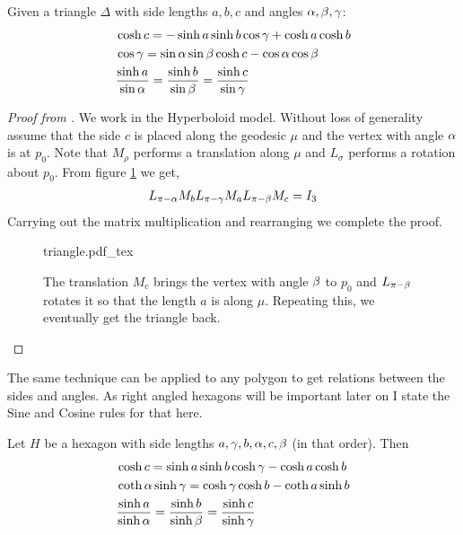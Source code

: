\begin{theorem}
  Given a triangle $\Delta$ with side lengths $a,b,c$ and angles $\alpha,\beta,\gamma$:
  \begin{align}
    &\cosh{c} = -\sinh{a}\sinh{b}\cos{\gamma} + \cosh{a}\cosh{b}\\
    &\cos{\gamma} = \sin{\alpha}\sin{\beta}\cosh{c} - \cos{\alpha}\cos{\beta}\\
    &\frac{\sinh{a}}{\sin{\alpha}} = \frac{\sinh{b}}{\sin{\beta}} = \frac{\sinh{c}}{\sin{\gamma}}
  \end{align}
\end{theorem}
\begin{proof}[Proof from \cite{buser}]
  We work in the Hyperboloid model. Without loss of generality assume that the side $c$ is placed along the geodesic $\mu$ and the vertex with angle $\alpha$ is at $p_0$. Note that $M_\rho$ performs a translation along $\mu$ and $L_\sigma$ performs a rotation about $p_0$. From figure \ref{fig:triangle0} we get,
  \begin{align}
    L_{\pi-\alpha}M_b L_{\pi-\gamma} M_a L_{\pi-\beta} M_c = I_3
  \end{align}
  Carrying out the matrix multiplication and rearranging we complete the proof.
  \begin{figure}[h]
    \centering
    \def\svgwidth{0.7\textwidth}
    {triangle.pdf_tex}
    \caption[Proof of sine and cosine laws.]{The translation $M_c$ brings the vertex with angle $\beta$ to $p_0$ and $L_{\pi-\beta}$ rotates it so that the length $a$ is along $\mu$. Repeating this, we eventually get the triangle back.}
    \label{fig:triangle0}
  \end{figure}
\end{proof}
The same technique can be applied to any polygon to get relations between the sides and angles. As right angled hexagons will be important later on I state the Sine and Cosine rules for that here.
\begin{theorem}\label{thm:hexagon}
  Let $H$ be a hexagon with side lengths $a,\gamma, b, \alpha, c, \beta$ (in that order). Then
  \begin{align}    
    &\cosh{c} = \sinh{a}\sinh{b}\cosh{\gamma} - \cosh{a}\cosh{b}\\
    &\coth{\alpha} \sinh{\gamma} = \cosh{\gamma}\cosh{b} - \coth{a}\sinh{b}\\
    &\frac{\sinh{a}}{\sinh{\alpha}} = \frac{\sinh{b}}{\sinh{\beta}} = \frac{\sinh{c}}{\sinh{\gamma}}
  \end{align}
\end{theorem}
